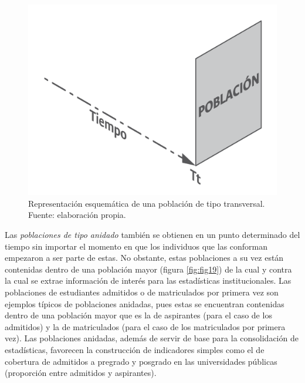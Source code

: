 \documentclass[
]{book}
\begin{document}
\begin{figure}

{\centering \includegraphics[width=0.75\linewidth]{imagenes/F_18} 

}

\caption{Representación esquemática de una población de tipo transversal. Fuente: elaboración propia.}\label{fig:fig18}
\end{figure}

Las \emph{poblaciones de tipo anidado} también se obtienen en un punto determinado del tiempo sin importar el momento en que los individuos que las conforman empezaron a ser parte de estas. No obstante, estas poblaciones a su vez están contenidas dentro de una población mayor (figura \ref{fig:fig19}) de la cual y contra la cual se extrae información de interés para las estadísticas institucionales. Las poblaciones de estudiantes admitidos o de matriculados por primera vez son ejemplos típicos de poblaciones anidadas, pues estas se encuentran contenidas dentro de una población mayor que es la de aspirantes (para el caso de los admitidos) y la de matriculados (para el caso de los matriculados por primera vez). Las poblaciones anidadas, además de servir de base para la consolidación de estadísticas, favorecen la construcción de indicadores simples como el de cobertura de admitidos a pregrado y posgrado en las universidades públicas (proporción entre admitidos y aspirantes).
\end{document}
